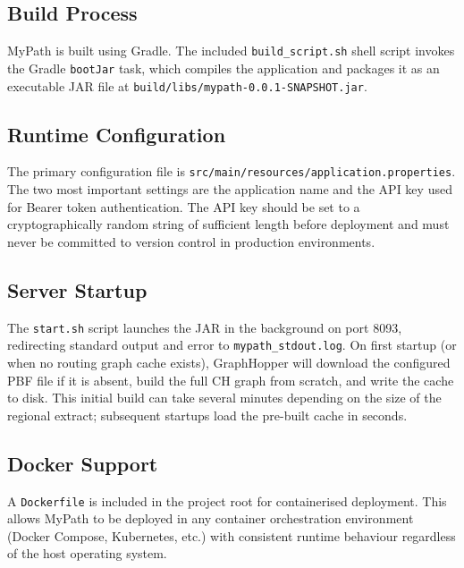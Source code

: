 \documentclass[12pt, a4paper]{report}
\begin{document}
\subsection{Build Process}
\label{subsec:build}

MyPath is built using Gradle. The included \texttt{build\_script.sh} shell script invokes the Gradle \texttt{bootJar} task, which compiles the application and packages it as an executable JAR file at \texttt{build/libs/mypath-0.0.1-SNAPSHOT.jar}.

\subsection{Runtime Configuration}
\label{subsec:config}

The primary configuration file is \texttt{src/main/resources/application.properties}. The two most important settings are the application name and the API key used for Bearer token authentication. The API key should be set to a cryptographically random string of sufficient length before deployment and must never be committed to version control in production environments.

\subsection{Server Startup}
\label{subsec:startup}

The \texttt{start.sh} script launches the JAR in the background on port 8093, redirecting standard output and error to \texttt{mypath\_stdout.log}. On first startup (or when no routing graph cache exists), GraphHopper will download the configured PBF file if it is absent, build the full CH graph from scratch, and write the cache to disk. This initial build can take several minutes depending on the size of the regional extract; subsequent startups load the pre-built cache in seconds.

\subsection{Docker Support}
\label{subsec:docker}

A \texttt{Dockerfile} is included in the project root for containerised deployment. This allows MyPath to be deployed in any container orchestration environment (Docker Compose, Kubernetes, etc.) with consistent runtime behaviour regardless of the host operating system.

\end{document}
